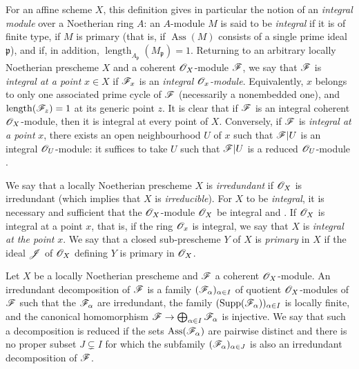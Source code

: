 For an affine scheme $X$, this definition gives in particular the notion of an \emph{integral module} over a Noetherian ring $A$: an $A$-module $M$ is said to be \emph{integral} if it is of finite type, if $M$ is primary (that is, if $\operatorname{Ass}(M)$ consists of a single prime ideal $\mathfrak{p}$), and if, in addition, $\operatorname{length}_{A_\mathfrak{p}}(M_\mathfrak{p})=1$.
Returning to an arbitrary locally Noetherian prescheme $X$ and a coherent $\mathscr{O}_X$-module $\mathscr{F}$, we say that $\mathscr{F}$ is \emph{integral at a point} $x\in X$ if $\mathscr{F}_x$ is an \emph{integral $\mathscr{O}_x$-module}.  Equivalently, $x$ belongs to only one associated prime cycle of $\mathscr{F}$ (necessarily a nonembedded one), and $\operatorname{length}(\mathscr{F}_z)=1$ at its generic point $z$.
It is clear that if $\mathscr{F}$ is an integral coherent $\mathscr{O}_X$-module, then it is integral at every point of $X$.  Conversely, if $\mathscr{F}$ is \emph{integral at a point} $x$, there exists an open neighbourhood $U$ of $x$ such that $\mathscr{F}|U$ is an integral $\mathscr{O}_U$-module: it suffices to take $U$ such that $\mathscr{F}|U$ is a reduced $\mathscr{O}_U$-module .


We say that a locally Noetherian prescheme $X$ is \emph{irredundant} if $\mathscr{O}_X$ is irredundant (which implies that $X$ is \emph{irreducible}).  For $X$ to be \emph{integral}, it is necessary and sufficient that the $\mathscr{O}_X$-module $\mathscr{O}_X$ be integral  and .
If $\mathscr{O}_X$ is integral at a point $x$, that is, if the ring $\mathscr{O}_x$ is integral, we say that $X$ is \emph{integral at the point} $x$.
We say that a closed sub-prescheme $Y$ of $X$ is \emph{primary} in $X$ if the ideal $\mathscr{J}$ of $\mathscr{O}_X$ defining $Y$ is primary in $\mathscr{O}_X$.

\begin{definition}[3.2.5]
\label{IV.3.2.5}
Let $X$ be a locally Noetherian prescheme and $\mathscr{F}$ a coherent $\mathscr{O}_X$-module.
An irredundant decomposition of $\mathscr{F}$ is a family $(\mathscr{F}_\alpha)_{\alpha\in I}$ of quotient $\mathscr{O}_X$-modules of $\mathscr{F}$ such that the $\mathscr{F}_\alpha$ are irredundant, the family $(\operatorname{Supp}(\mathscr{F}_\alpha))_{\alpha\in I}$ is locally finite, and the canonical homomorphism $\mathscr{F}\to\bigoplus_{\alpha\in I}\mathscr{F}_\alpha$ is injective.
We say that such a decomposition is reduced if the sets $\operatorname{Ass}(\mathscr{F}_\alpha)$ are pairwise distinct and there is no proper subset $J\subsetneq I$ for which the subfamily $(\mathscr{F}_\alpha)_{\alpha\in J}$ is also an irredundant decomposition of $\mathscr{F}$.
\end{definition}

